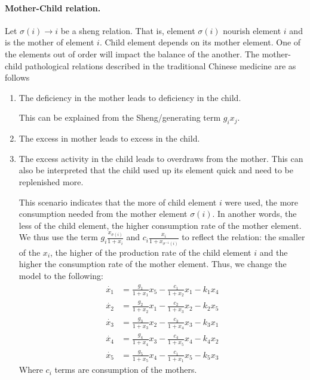 \documentclass{article}
\begin{document}
\paragraph{Mother-Child relation. } Let $\sigma(i) \to i$ be a sheng relation. That is,  element $\sigma(i)$ nourish element $i$ and is  the mother of element $i$. Child element depends on its mother element. One of the  elements out of order will impact the balance of the another.  
The mother-child pathological relations described in the traditional Chinese medicine are as follows \cite{NeiJing}
\begin{enumerate}
\item The deficiency in the mother leads to deficiency in the child. 

This can be explained from the Sheng/generating term $g_ix_j$. 
\item The excess in mother leads to excess in the child.
\item The excess activity in the child leads to overdraws from the mother. This can also be interpreted  that the child used up its element quick and need to be replenished more. 

This scenario indicates that the more of child element $i$ were used, the more consumption needed from the mother element $\sigma(i)$. In another words, the less of the child element, the higher consumption rate of the mother element. We thus use     the term $g_i \frac{x_{\sigma(i)}}{1+x_i}$ and 
$c_i \frac{x_i}{1+x_{\sigma^{-1}(i)}}$  to reflect the relation: the smaller of the $x_i$, the higher of the production rate of the child element $i$ and the higher the consumption rate of the mother element. 
Thus, we change the model to the following: 
\begin{equation}
\begin{array}{rl}
\dot{x_1} &= \frac{g_1}{1+x_1}x_5  - \frac{c_1}{1+x_2} x_1 - k_1 x_4\\
\dot{x_2} &= \frac{g_2}{1+x_2} x_1 - \frac{c_2}{1+x_3} x_2 - k_2 x_5\\
\dot{x_3} &= \frac{g_3}{1+x_3} x_2  - \frac{c_3}{1+x_4} x_3 - k_3 x_1\\
\dot{x_4} &= \frac{g_4}{1+x_4} x_3  - \frac{c_4}{1+x_5} x_4  - k_4 x_2\\
\dot{x_5} &= \frac{g_5}{1+x_5} x_4    - \frac{c_1}{1+x_1}x_5  - k_5 x_3
\end{array}
\end{equation}
Where $c_i$ terms are consumption of the mothers.
\end{enumerate}
\end{document}
